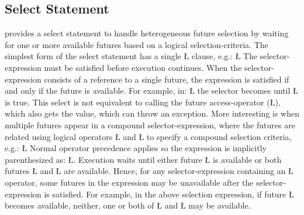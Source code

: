 \documentclass[openright,twoside]{report}
\begin{document}
\subsection{Select Statement}
\label{s:SelectStatement}

\uC provides a select statement to handle heterogeneous future selection by waiting for one or more available futures based on a logical selection-criteria.
The simplest form of the select statement has a single \LGinlinetrue\LGbegin\lgrinde\L{}\endlgrinde\LGend{} clause, e.g.:
\LGinlinefalse\LGbegin\lgrinde
\L{}
\endlgrinde\LGend
{}%
The selector-expression must be satisfied before execution continues.
When the selector-expression consists of a reference to a single future, the expression is satisfied if and only if the future is available.
For example, in:
\LGinlinefalse\LGbegin\lgrinde
\L{}
\endlgrinde\LGend
the selector becomes  until \LGinlinetrue\LGbegin\lgrinde\L{}\endlgrinde\LGend{} is true.
This select is not equivalent to calling the future access-operator (\LGinlinetrue\LGbegin\lgrinde\L{}\endlgrinde\LGend{}), which also gets the value, which can throw an exception.
More interesting is when multiple futures appear in a compound selector-expression, where the futures are related using logical operators \LGinlinetrue\LGbegin\lgrinde\L{\LB{\|\,\|}}\endlgrinde\LGend{} and \LGinlinetrue\LGbegin\lgrinde\L{\LB{\&\&}}\endlgrinde\LGend{} to specify a compound selection criteria, e.g.:
\LGinlinefalse\LGbegin\lgrinde
\L{}
\endlgrinde\LGend
Normal operator precedence applies so the expression is implicitly parenthesized as: \LGinlinetrue\LGbegin\lgrinde\L{}\endlgrinde\LGend{}.
Execution waits until either future \LGinlinetrue\LGbegin\lgrinde\L{}\endlgrinde\LGend{} is available or both futures \LGinlinetrue\LGbegin\lgrinde\L{}\endlgrinde\LGend{} and \LGinlinetrue\LGbegin\lgrinde\L{}\endlgrinde\LGend{} are available.
Hence, for any selector-expression containing an \LGinlinetrue\LGbegin\lgrinde\L{\LB{\|\,\|}}\endlgrinde\LGend{} operator, some futures in the expression may be unavailable after the selector-expression is satisfied.
For example, in the above selection expression, if future \LGinlinetrue\LGbegin\lgrinde\L{}\endlgrinde\LGend{} becomes available, neither, one or both of \LGinlinetrue\LGbegin\lgrinde\L{}\endlgrinde\LGend{} and \LGinlinetrue\LGbegin\lgrinde\L{}\endlgrinde\LGend{} may be available.
\end{document}
